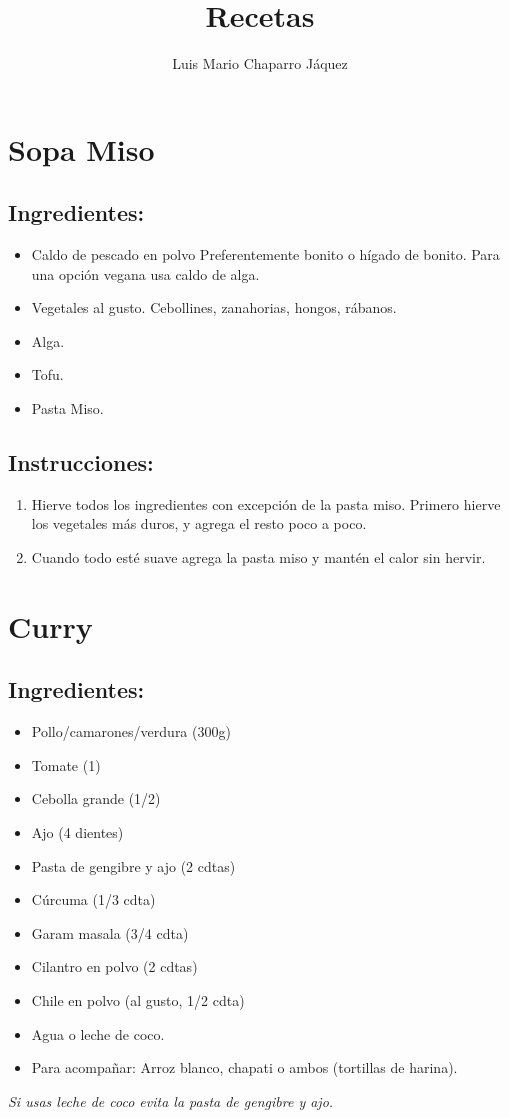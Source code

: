 \documentclass[a4paper]{article}
\title{Recetas}
\author{Luis Mario Chaparro Jáquez}
\begin{document}
	\maketitle
	\tableofcontents

	\newpage
	\section{Sopa Miso}
	\subsection{Ingredientes:}
	\begin{itemize}
		\item Caldo de pescado en polvo 
			\subitem Preferentemente bonito o hígado de bonito.
			\subitem Para una opción vegana usa caldo de alga.
		\item Vegetales al gusto.
			\subitem Cebollines, zanahorias, hongos, rábanos.
		\item Alga.
		\item Tofu.
		\item Pasta Miso.
	\end{itemize}
	\subsection{Instrucciones:}
	\begin{enumerate}
		\item Hierve todos los ingredientes con excepción de la pasta miso.
			Primero hierve los vegetales más duros, y agrega el resto poco a poco.
		\item Cuando todo esté suave agrega la pasta miso y mantén el calor sin hervir.
	\end{enumerate}

	\newpage
	\section{Curry}
	\subsection{Ingredientes:}
	\begin{itemize}
		\item Pollo/camarones/verdura (300g)
		\item Tomate (1)
		\item Cebolla grande (1/2)
		\item Ajo (4 dientes)
		\item Pasta de gengibre y ajo (2 cdtas)
		\item Cúrcuma (1/3 cdta)
		\item Garam masala (3/4 cdta)
		\item Cilantro en polvo (2 cdtas)
		\item Chile en polvo (al gusto, 1/2 cdta)
		\item Agua o leche de coco.
                \item Para acompañar: Arroz blanco, chapati o ambos (tortillas de harina).
	\end{itemize}
	\textit{Si usas leche de coco evita la pasta de gengibre y ajo.}
\end{document}

